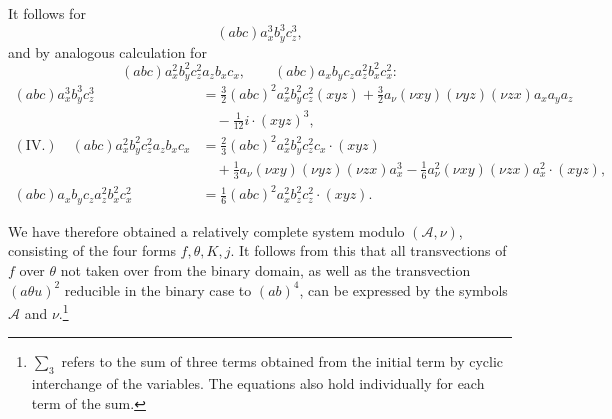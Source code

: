 \documentclass[11pt]{article}
\newcommand{\A}{\mathcal A}
\begin{document}
It follows for
\[
(abc)a_x^3b_y^3c_z^3,
\]
and by analogous calculation for
\[
(abc)a_x^2b_y^2c_z^2a_zb_xc_x,\qquad
(abc)a_xb_yc_za_z^2b_x^2c_x^2:
\]
\[
\begin{aligned}
(abc)a_x^3b_y^3c_z^3
&=\frac32(abc)^2a_x^2b_y^2c_z^2(xyz)
+\frac32 a_\nu(\nu xy)(\nu yz)(\nu zx)a_xa_ya_z\\
&\quad-\frac1{12}i\cdot(xyz)^3,\\[0.4em]
(\text{IV.})\quad
(abc)a_x^2b_y^2c_z^2a_zb_xc_x
&=\frac23(abc)^2a_x^2b_y^2c_z^2c_x\cdot(xyz)\\
&\quad+\frac13a_\nu(\nu xy)(\nu yz)(\nu zx)a_x^3
-\frac16 a_\nu^2(\nu xy)(\nu zx)a_x^2\cdot(xyz),\\[0.4em]
(abc)a_xb_yc_za_z^2b_x^2c_x^2
&=\frac16(abc)^2a_x^2b_z^2c_z^2\cdot(xyz).
\end{aligned}
\]

We have therefore obtained a relatively complete system modulo $(\A,\nu)$, consisting of the four forms $f,\theta,K,j$. It follows from this that all transvections of $f$ over $\theta$ not taken over from the binary domain, as well as the transvection $(a\theta u)^2$ reducible in the binary case to $(ab)^4$, can be expressed by the symbols $\A$ and $\nu$.\footnote{$\sum_3$ refers to the sum of three terms obtained from the initial term by cyclic interchange of the variables. The equations also hold individually for each term of the sum.}
\end{document}
